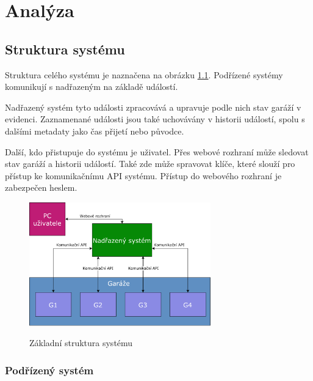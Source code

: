 \chapter{Analýza}

\section{Struktura systému}

Struktura celého systému je naznačena na obrázku \ref{fig:basic_struct}. Podřízené systémy komunikují s nadřazeným na základě událostí.

Nadřazený systém tyto události zpracovává a upravuje podle nich stav garáží v evidenci. Zaznamenané události jsou také uchovávány v historii událostí, spolu s dalšími metadaty jako čas přijetí nebo původce.


Další, kdo přistupuje do systému je uživatel. Přes webové rozhraní může sledovat stav garáží a historii událostí. Také zde může spravovat klíče, které slouží pro přístup ke komunikačnímu API systému. Přístup do webového rozhraní je zabezpečen heslem. 

\begin{figure}[h!]
    \centering
    \includegraphics[width=0.7\textwidth]{images/basic_struct.pdf}
    \label{fig:basic_struct}
    \caption[Konečná podoba zařízení]{Základní struktura systému}
\end{figure}

\subsection{Podřízený systém}

